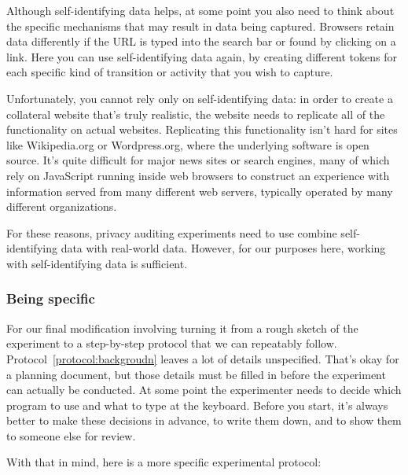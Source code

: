 {Although self-identifying data helps, at some point you also need to
think about the specific mechanisms that may result in data being
captured. Browsers retain data differently if the URL is typed
into the search bar or found by clicking on a link. Here you can use
self-identifying data again, by creating different tokens for each
specific kind of transition or activity that you wish to capture. 

Unfortunately, you cannot rely only on self-identifying data: in order
to create a collateral website that's truly realistic, the website
needs to replicate all of the functionality on actual
websites. Replicating this functionality isn't hard for sites like
Wikipedia.org or Wordpress.org, where the underlying software is open
source. It's quite difficult for major news sites or search engines,
many of which rely on JavaScript running inside web browsers to
construct an experience with information served from many different
web servers, typically operated by many different organizations.

For these reasons, privacy auditing experiments need to use combine
self-identifying data with real-world data. However, for our purposes
here, working with self-identifying data is sufficient.

\subsubsection{Being specific}
For our final modification involving turning it from a rough sketch of
the experiment to a step-by-step protocol that we can repeatably
follow. Protocol~\ref{protocol:backgroudn} leaves a lot of details
unspecified. That's okay for a planning document, but those details
must be filled in before the experiment can actually be
conducted. At some point the experimenter needs to decide which
program to use and what to type at the keyboard. Before you start, it's always 
better to make these decisions in advance, to write them down, and to
show them to someone else for review.

With that in mind, here is a more specific experimental protocol:

}
